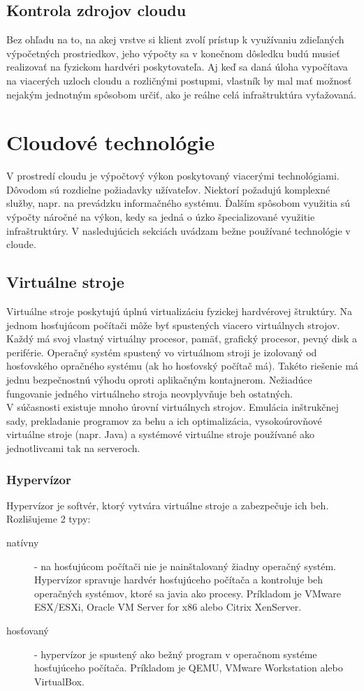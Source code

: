 \documentclass[11pt,final,oneside]{fithesis}
\begin{document}
\subsection{Kontrola zdrojov cloudu}
Bez ohľadu na to, na akej vrstve si klient zvolí prístup k využívaniu zdieľaných výpočetných prostriedkov, jeho výpočty sa v konečnom dôsledku budú musieť realizovať na fyzickom hardvéri poskytovateľa. 
Aj keď sa daná úloha vypočítava na viacerých uzloch cloudu a rozličnými postupmi, vlastník by mal mať možnosť nejakým jednotným spôsobom určiť, ako je reálne celá infraštruktúra vyťažovaná.

\section {Cloudové technológie}
V prostredí cloudu je výpočtový výkon poskytovaný viacerými technológiami. Dôvodom sú rozdielne požiadavky užívateľov. Niektorí požadujú komplexné služby, napr. na prevádzku informačného systému.
Ďalším spôsobom využitia sú výpočty náročné na výkon, kedy sa jedná o úzko špecializované využitie infraštruktúry. V nasledujúcich sekciách uvádzam bežne používané technológie v cloude.

\subsection{Virtuálne stroje}
Virtuálne stroje poskytujú úplnú virtualizáciu fyzickej hardvérovej štruktúry. Na jednom hosťujúcom počítači môže byť spustených viacero virtuálnych strojov. Každý má svoj vlastný virtuálny procesor, pamäť, grafický procesor, pevný disk 
a periférie. Operačný systém spustený vo virtuálnom stroji je izolovaný od hosťovského opračného systému (ak ho hosťovský počítač má). Takéto riešenie má jednu bezpečnostnú výhodu oproti aplikačným 
kontajnerom. Nežiadúce fungovanie jedného virtuálneho stroja neovplyvňuje beh ostatných.
\\V súčasnosti existuje mnoho úrovní virtuálnych strojov. Emulácia inštrukčnej sady, prekladanie programov za behu a ich optimalizácia, vysokoúrovňové virtuálne stroje (napr. Java) a systémové virtuálne stroje používané ako
jednotlivcami tak na serveroch.

\subsubsection{Hypervízor}
Hypervízor je softvér, ktorý vytvára virtuálne stroje a zabezpečuje ich beh. Rozlišujeme 2 typy:
\begin{description}
\item[natívny] - na hosťujúcom počítači nie je nainštalovaný žiadny operačný systém. Hypervízor spravuje hardvér hosťujúceho počítača a kontroluje beh operačných systémov, ktoré sa javia ako procesy.
Príkladom je VMware ESX/ESXi, Oracle VM Server for x86 alebo Citrix XenServer.
\item[hosťovaný] - hypervízor je spustený ako bežný program v operačnom systéme hosťujúceho počítača. Príkladom je QEMU, VMware Workstation alebo VirtualBox.
\end{description}
\cite{hypervisorTypes}
\end{document}
